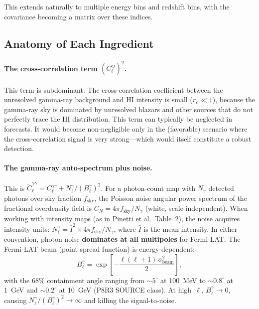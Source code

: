\documentclass[10pt,a4paper]{article}
\newcommand{\Cl}{C_\ell}
\newcommand{\fsky}{f_{\mathrm{sky}}}
\begin{document}
This extends naturally to multiple energy bins and redshift bins, with the covariance becoming a matrix over these indices.


\subsection{Anatomy of Each Ingredient}

\paragraph{The cross-correlation term $(\Cl^{ij})^2$.}
This term is subdominant. The cross-correlation coefficient between the unresolved gamma-ray background and HI intensity is small ($r_\ell \ll 1$), because the gamma-ray sky is dominated by unresolved blazars and other sources that do not perfectly trace the HI distribution. This term can typically be neglected in forecasts. It would become non-negligible only in the (favorable) scenario where the cross-correlation signal is very strong---which would itself constitute a robust detection.

\paragraph{The gamma-ray auto-spectrum plus noise.}
This is $\tilde{C}_\ell^{\gamma\gamma} = \Cl^{\gamma\gamma} + N_\ell^\gamma / (B_\ell^\gamma)^2$. For a photon-count map with $N_\gamma$ detected photons over sky fraction $\fsky$, the Poisson noise angular power spectrum of the fractional overdensity field is $C_N = 4\pi \fsky / N_\gamma$ (white, scale-independent). When working with intensity maps (as in Pinetti et al.\ Table~2), the noise acquires intensity units: $N_\ell^\gamma = \bar{I}^2 \times 4\pi \fsky / N_\gamma$, where $\bar{I}$ is the mean intensity. In either convention, photon noise \textbf{dominates at all multipoles} for Fermi-LAT. The Fermi-LAT beam (point spread function) is energy-dependent:
\begin{equation}
B_\ell^\gamma = \exp\!\left[-\frac{\ell(\ell+1)\,\sigma_{\mathrm{beam}}^2}{2}\right],
\end{equation}
with the 68\% containment angle ranging from $\sim 5^\circ$ at 100~MeV to $\sim 0.8^\circ$ at 1~GeV and $\sim 0.2^\circ$ at 10~GeV (P8R3 SOURCE class). At high~$\ell$, $B_\ell^\gamma \to 0$, causing $N_\ell^\gamma/(B_\ell^\gamma)^2 \to \infty$ and killing the signal-to-noise.
\end{document}
